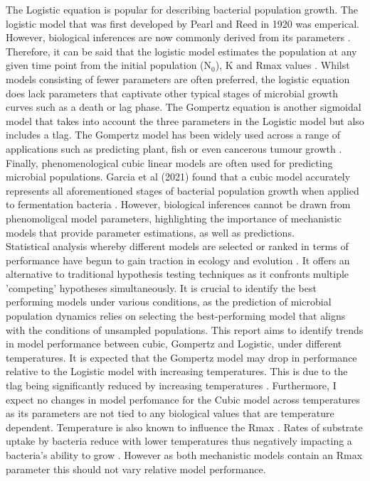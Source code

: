 \documentclass[11pt]{article}
\begin{document}
The Logistic equation is popular for describing bacterial population growth. The logistic model that was first developed by Pearl and Reed in 1920 was emperical. However, biological inferences are now commonly derived from its parameters \cite{WACHENHEIM2003157} \cite{Pearl1920}. Therefore, it can be said that the logistic model estimates the population at any given time point from the initial population ($\mathrm{N}_0$), K and Rmax values \cite{WACHENHEIM2003157}. Whilst models consisting of fewer parameters are often preferred, the logistic equation does lack parameters that captivate other typical stages of microbial growth curves such as a death or lag phase. The Gompertz equation is another sigmoidal model that takes into account the three parameters in the Logistic model but also includes a tlag. The Gompertz model has been widely used across a range of applications such as predicting plant, fish or even cancerous tumour growth \cite{Tjrve2017}. Finally, phenomenological cubic linear models are often used for predicting microbial populations. Garcia et al (2021) found that a cubic model accurately represents all aforementioned stages of bacterial population growth when applied to fermentation bacteria \cite{Garcia2021}. However, biological inferences cannot be drawn from phenomoligcal model parameters, highlighting the importance of mechanistic models that provide parameter estimations, as well as predictions.\\

Statistical analysis whereby different models are selected or ranked in terms of performance have begun to gain traction in ecology and evolution \cite{JOHNSON2004101}. It offers an alternative to traditional hypothesis testing techniques as it confronts multiple 'competing' hypotheses simultaneously. It is crucial to identify the best performing models under various conditions, as the prediction of microbial population dynamics relies on selecting the best-performing model that aligns with the conditions of unsampled populations. This report aims to identify trends in model performance between cubic, Gompertz and Logistic, under different temperatures. It is expected that the Gompertz model may drop in performance relative to the Logistic model with increasing temperatures. This is due to the tlag being significantly reduced by increasing temperatures \cite{ABA2021109108}. Furthermore, I expect no changes in model perfomance for the Cubic model across temperatures as its parameters are not tied to any biological values that are temperature dependent. Temperature is also known to influence the Rmax\cite{Ward1972} \cite{Dey2020}. Rates of substrate uptake by bacteria reduce with lower temperatures thus negatively impacting a bacteria's ability to grow \cite{Nedwell1994}. However as both mechanistic models contain an Rmax parameter this should not vary relative model performance.\\
\end{document}
